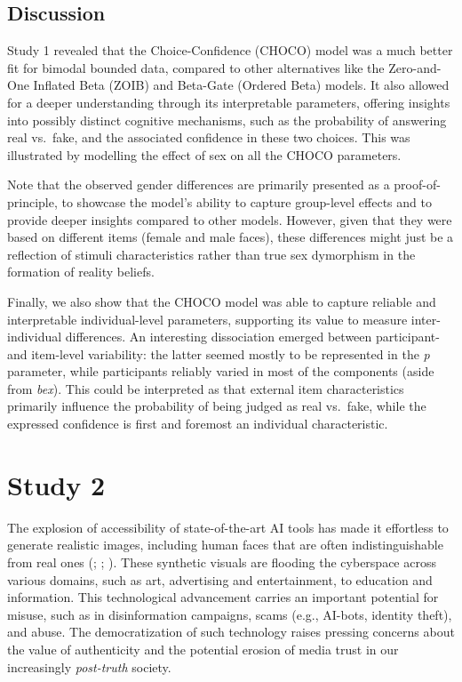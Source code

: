 \documentclass[
  jou,
  floatsintext,
  longtable,
  nolmodern,
  notxfonts,
  notimes,
  colorlinks=true,linkcolor=blue,citecolor=blue,urlcolor=blue]{apa7}
\begin{document}
\subsection{Discussion}\label{discussion}

Study 1 revealed that the Choice-Confidence (CHOCO) model was a much
better fit for bimodal bounded data, compared to other alternatives like
the Zero-and-One Inflated Beta (ZOIB) and Beta-Gate (Ordered Beta)
models. It also allowed for a deeper understanding through its
interpretable parameters, offering insights into possibly distinct
cognitive mechanisms, such as the probability of answering real
vs.~fake, and the associated confidence in these two choices. This was
illustrated by modelling the effect of sex on all the CHOCO parameters.

Note that the observed gender differences are primarily presented as a
proof-of-principle, to showcase the model's ability to capture
group-level effects and to provide deeper insights compared to other
models. However, given that they were based on different items (female
and male faces), these differences might just be a reflection of stimuli
characteristics rather than true sex dymorphism in the formation of
reality beliefs.

Finally, we also show that the CHOCO model was able to capture reliable
and interpretable individual-level parameters, supporting its value to
measure inter-individual differences. An interesting dissociation
emerged between participant- and item-level variability: the latter
seemed mostly to be represented in the \emph{p} parameter, while
participants reliably varied in most of the components (aside from
\emph{bex}). This could be interpreted as that external item
characteristics primarily influence the probability of being judged as
real vs.~fake, while the expressed confidence is first and foremost an
individual characteristic.

\section{Study 2}\label{study-2}

The explosion of accessibility of state-of-the-art AI tools has made it
effortless to generate realistic images, including human faces that are
often indistinguishable from real ones
(;
;
). These
synthetic visuals are flooding the cyberspace across various domains,
such as art, advertising and entertainment, to education and
information. This technological advancement carries an important
potential for misuse, such as in disinformation campaigns, scams (e.g.,
AI-bots, identity theft), and abuse. The democratization of such
technology raises pressing concerns about the value of authenticity and
the potential erosion of media trust in our increasingly
\emph{post-truth} society.
\end{document}
